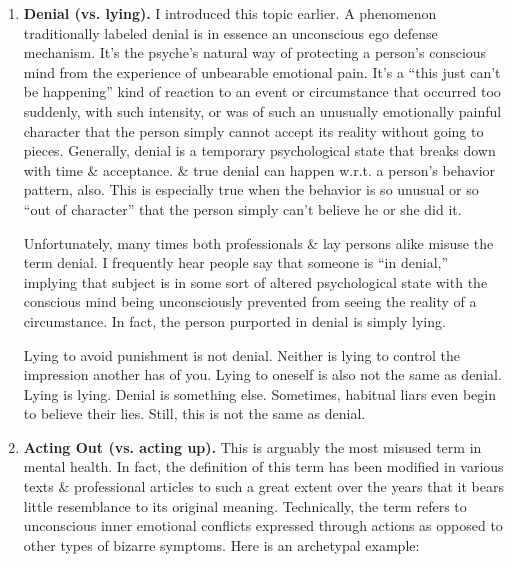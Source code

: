 \documentclass{article}
\numberwithin{equation}{section}
\begin{document}
\begin{itemize}
	\begin{enumerate}
		\item \textbf{Denial (vs. lying).} I introduced this topic earlier. A phenomenon traditionally labeled denial is in essence an unconscious ego defense mechanism. It's the psyche's natural way of protecting a person's conscious mind from the experience of unbearable emotional pain. It's a ``this just can't be happening'' kind of reaction to an event or circumstance that occurred too suddenly, with such intensity, or was of such an unusually emotionally painful character that the person simply cannot accept its reality without going to pieces. Generally, denial is a temporary psychological state that breaks down with time \& acceptance. \& true denial can happen w.r.t. a person's behavior pattern, also. This is especially true when the behavior is so unusual or so ``out of character'' that the person simply can't believe he or she did it.
		
		Unfortunately, many times both professionals \& lay persons alike misuse the term denial. I frequently hear people say that someone is ``in denial,'' implying that subject is in some sort of altered psychological state with the conscious mind being unconsciously prevented from seeing the reality of a circumstance. In fact, the person purported in denial is simply lying.
		
		Lying to avoid punishment is not denial. Neither is lying to control the impression another has of you. Lying to oneself is also not the same as denial. Lying is lying. Denial is something else. Sometimes, habitual liars even begin to believe their lies. Still, this is not the same as denial.
		\item \textbf{Acting Out (vs. acting up).} This is arguably the most misused term in mental health. In fact, the definition of this term has been modified in various texts \& professional articles to such a great extent over the years that it bears little resemblance to its original meaning. Technically, the term refers to unconscious inner emotional conflicts expressed through actions as opposed to other types of bizarre symptoms. Here is an archetypal example:
		

\end{enumerate}
\end{itemize}
\end{document}
